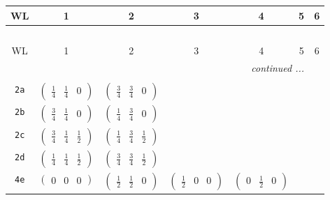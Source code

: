 \documentclass[fleqn,9pt,landscape]{jsarticle}
\begin{document}
\begin{center}
\renewcommand{\arraystretch}{1.2}
\begin{longtable}{ccccccc}
 \hline \hline
WL & 1 & 2 & 3 & 4 & 5 & 6 \\ \hline \endfirsthead

\multicolumn{6}{l}{\tablename\ \thetable{}} \\
 \hline \hline
WL & 1 & 2 & 3 & 4 & 5 & 6 \\ \hline \endhead

 \hline \hline
\multicolumn{6}{r}{\footnotesize\it continued ...} \\ \endfoot

 \hline \hline
\multicolumn{6}{r}{} \\ \endlastfoot

{\tt 2a} & $ \begin{pmatrix} \frac{1}{4} & \frac{1}{4} & 0 \end{pmatrix} $ & $ \begin{pmatrix} \frac{3}{4} & \frac{3}{4} & 0 \end{pmatrix} $ & $  $ & $  $ & $  $ & $  $ \\ \hline
{\tt 2b} & $ \begin{pmatrix} \frac{3}{4} & \frac{1}{4} & 0 \end{pmatrix} $ & $ \begin{pmatrix} \frac{1}{4} & \frac{3}{4} & 0 \end{pmatrix} $ & $  $ & $  $ & $  $ & $  $ \\ \hline
{\tt 2c} & $ \begin{pmatrix} \frac{3}{4} & \frac{1}{4} & \frac{1}{2} \end{pmatrix} $ & $ \begin{pmatrix} \frac{1}{4} & \frac{3}{4} & \frac{1}{2} \end{pmatrix} $ & $  $ & $  $ & $  $ & $  $ \\ \hline
{\tt 2d} & $ \begin{pmatrix} \frac{1}{4} & \frac{1}{4} & \frac{1}{2} \end{pmatrix} $ & $ \begin{pmatrix} \frac{3}{4} & \frac{3}{4} & \frac{1}{2} \end{pmatrix} $ & $  $ & $  $ & $  $ & $  $ \\ \hline
{\tt 4e} & $ \begin{pmatrix} 0 & 0 & 0 \end{pmatrix} $ & $ \begin{pmatrix} \frac{1}{2} & \frac{1}{2} & 0 \end{pmatrix} $ & $ \begin{pmatrix} \frac{1}{2} & 0 & 0 \end{pmatrix} $ & $ \begin{pmatrix} 0 & \frac{1}{2} & 0 \end{pmatrix} $ & $  $ & $  $ \\ \hline

\end{longtable}
\end{center}
\end{document}
